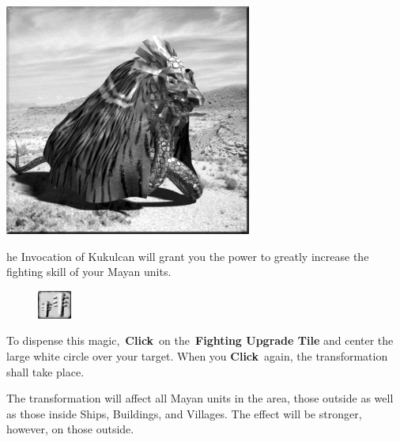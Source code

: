 
\begin{center}
	\includegraphics[width=1\linewidth]{Akukulcan}
\end{center}

he Invocation of Kukulcan will grant you the power to greatly increase the fighting skill of your Mayan units.

\begin{figure}
	\vspace{-20pt}
	\begin{center}
		\includegraphics[width=0.1\textwidth]{Tfightupgrade}
	\end{center}
	\vspace{-20pt}
\end{figure}

To dispense this magic, \textbf{Click} on the \textbf{Fighting Upgrade Tile} and center the large white circle over your target. When you \textbf{Click} again, the transformation shall take place.

The transformation will affect all Mayan units in the area, those outside as well as those inside Ships, Buildings, and Villages. The effect will be stronger, however, on those outside.

